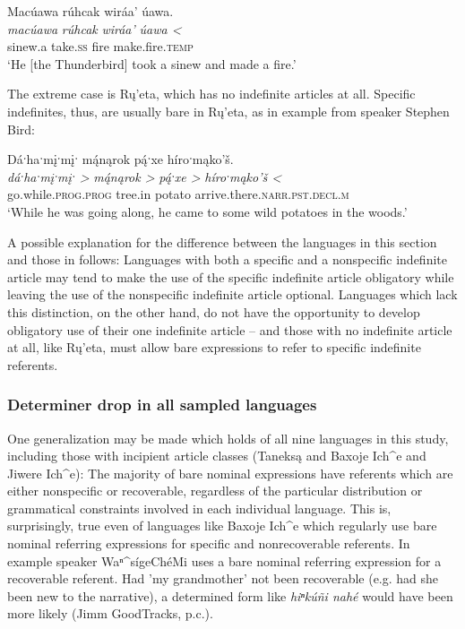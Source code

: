 \documentclass[output=paper]{LSP/langsci}
\begin{document}
\ea\label{eagledrop}
Macúawa rúhcak wiráa’ úawa.\footnotemark\\
\gll	\emph{macúawa} 	\emph{rúhcak} 	\emph{wiráa’}	\emph{úawa <}\\
	sinew.a 		take.\textsc{ss} 	fire 			make.fire.\textsc{temp}\\
\glt	`He [the Thunderbird] took a sinew and made a fire.'
\z

The extreme case is Rų’eta, which has no indefinite articles at all. Specific indefinites, thus, are usually bare in Rų’eta, as in example  from speaker Stephen Bird:

\ea\label{birddrop}
Dáˑhaˑmįˑmįˑ m\'{ą}nąrok p\'{ą}ˑxe híroˑmąko’š.\footnotemark\\
\gll	\emph{dáˑhaˑmįˑmįˑ >}		\emph{m\'{ą}nąrok >}	\emph{p\'{ą}ˑxe >}	\emph{híroˑmąko’š <}\\
	go.while.\textsc{prog.prog} 	tree.in 			potato 		arrive.there.\textsc{narr.pst.decl.m}\\
\glt	`While he was going along, he came to some wild potatoes in the woods.'
\z

A possible explanation for the difference between the languages in this section and those in  follows: Languages with both a specific and a nonspecific indefinite article may tend to make the use of the specific indefinite article obligatory while leaving the use of the nonspecific indefinite article optional. Languages which lack this distinction, on the other hand, do not have the opportunity to develop obligatory use of their one indefinite article -- and those with no indefinite article at all, like Rų’eta, must allow bare expressions to refer to specific indefinite referents.

\subsubsection{Determiner drop in all sampled languages}\label{dropsummary}

One generalization may be made which holds of all nine languages in this study, including those with incipient article classes (Taneksą and Baxoje Ich\^{}e and Jiwere Ich\^{}e): The majority of bare nominal expressions have referents which are either nonspecific or recoverable, regardless of the particular distribution or grammatical constraints involved in each individual language. This is, surprisingly, true even of languages like Baxoje Ich\^{}e which regularly use bare nominal referring expressions for specific and nonrecoverable referents. In example  speaker Waⁿ\^{}sígeChéMi uses a bare nominal referring expression for a recoverable referent. Had 'my grandmother' not been recoverable (e.g. had she been new to the narrative), a determined form like \emph{hiⁿkúñi nahé} would have been more likely (Jimm GoodTracks, p.c.).
\end{document}
